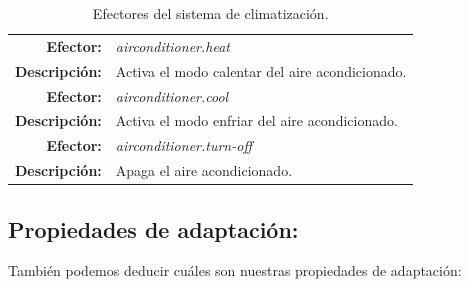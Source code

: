 \begin{table}[htb]
  \centering

  \begin{tabular}{|r p{11.5cm}|}
    \hline
    \textbf{Efector:} & \emph{airconditioner.heat}  \\
    \textbf{Descripción:} & Activa el modo calentar del aire acondicionado. \\
    \hline
    \textbf{Efector:} & \emph{airconditioner.cool}  \\
    \textbf{Descripción:} & Activa el modo enfriar del aire acondicionado. \\
    \hline
    \textbf{Efector:} & \emph{airconditioner.turn-off}  \\
    \textbf{Descripción:} & Apaga el aire acondicionado. \\
    \hline
  \end{tabular}

  \caption{Efectores del sistema de climatización.}
    \label{tab:climatisation-effectors}
\end{table}

\subsection{Propiedades de adaptación:}

También podemos deducir cuáles son nuestras propiedades de adaptación:

